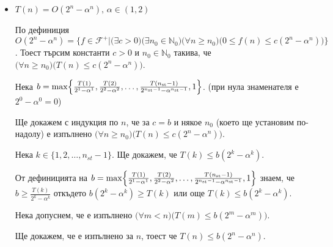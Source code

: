 \begin{solution}
\begin{itemize}
		\vspace{0.35cm}
		\item $T(n)=O(2^n-\alpha^n),\,\alpha\in(1,2)$
		
		По $\hyperref[bdef-asymp-classes]{\text{дефиниция}}$ $O(2^n-\alpha^n)\!=\!\{f\!\in\!\mathscr{F}^+|\big(\exists c\!>\!0\big)\big(\exists n_0\!\in\!\mathbb{N}_0\big)\big(\forall n\!\ge\! n_0\big)\big(0\le f(n)\le c(2^n-\alpha^n)\big)\}$. Тоест търсим константи $c>0$ и $n_0\in\mathbb{N}_0$ такива, че $\big(\forall n\ge n_0\big)\big(T(n)\le c(2^n-\alpha^n)\big)$.
		
		Нека $b=\max\Bigl\{\frac{T(1)}{2^1-\alpha^1},\frac{T(2)}{2^2-\alpha^2},\dots,\frac{T(n_{\text{st}}-1)}{2^{n_{\text{st}}-1}-\alpha^{n_{\text{st}}-1}},1\Bigr\}$. (при нула знаменателя е $2^0-\alpha^0=0$)
		
		Ще докажем с индукция по $n$, че за $c=b$ и някое $n_0$ (което ще установим по-надолу) е изпълнено $\big(\forall n\ge n_0\big)\big(T(n)\le c(2^n-\alpha^n)\big)$.
		
		\begin{base}
			Нека $k\in\{1,2,\dots,n_{st}-1\}$. Ще докажем, че $T(k)\le b(2^k-\alpha^k)$.
			
			От дефиницията на $b=\max\Bigl\{\frac{T(1)}{2^1-\alpha^1},\frac{T(2)}{2^2-\alpha^2},\dots,\frac{T(n_{\text{st}}-1)}{2^{n_{\text{st}}-1}-\alpha^{n_{\text{st}}-1}},1\Bigr\}$ знаем, че $b\ge \frac{T(k)}{2^k-\alpha^k}$ откъдето $b(2^k-\alpha^k)\ge T(k)$ или още $T(k)\le b(2^k-\alpha^k)$.
		\end{base}
		
		\begin{indhypothesis}
			Нека допуснем, че е изпълнено $\big(\forall m<n\big)\big(T(m)\le b(2^m-\alpha^m)\big)$.
		\end{indhypothesis}
	
		\begin{indstep}
			Ще докажем, че е изпълнено за $n$, тоест че $T(n)\le b(2^n-\alpha^n)$.
			

\end{indstep}
\end{itemize}
\end{solution}
